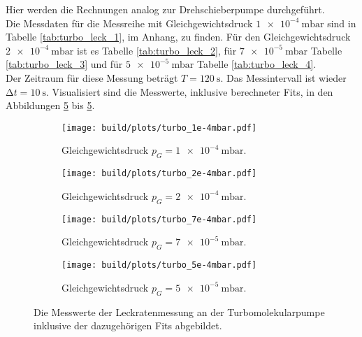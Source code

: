         \noindent
        Hier werden die Rechnungen analog zur Drehschieberpumpe durchgeführt.\\
        Die Messdaten für die Messreihe mit Gleichgewichtsdruck $\SI{1e-4}{\milli\bar}$ sind in Tabelle \ref{tab:turbo_leck_1}, im Anhang, zu finden.
        Für den Gleichgewichtsdruck $\SI{2e-4}{\milli\bar}$ ist es Tabelle \ref{tab:turbo_leck_2}, für  $\SI{7e-5}{\milli\bar}$ Tabelle \ref{tab:turbo_leck_3}
        und für $\SI{5e-5}{\milli\bar}$ Tabelle \ref{tab:turbo_leck_4}.\\
        Der Zeitraum für diese Messung beträgt $ T = \SI{120}{\second}$. Das Messintervall ist wieder $ \increment t = \SI{10}{\second}$.
        Visualisiert sind die Messwerte, inklusive berechneter Fits, in den Abbildungen \ref{img:3} bis \ref{img:3}.
        \begin{figure}[H]
          \begin{subfigure}{0.46\textwidth}
                  \centering
                  \texttt{[image: build/plots/turbo\_1e-4mbar.pdf]}
                  \caption{Gleichgewichtsdruck $p_G = \SI{1e-4}{\milli\bar}$.}
                  \label{img:turbo_leck_1}
          \end{subfigure}
          \hfill
          \begin{subfigure}{0.46\textwidth}
                  \centering
                  \texttt{[image: build/plots/turbo\_2e-4mbar.pdf]}
                  \caption{Gleichgewichtsdruck $p_G = \SI{2e-4}{\milli\bar}$.}
                  \label{img:turbo_leck_2}
          \end{subfigure}
          \hfill
          \begin{subfigure}{0.46\textwidth}
            \centering
            \texttt{[image: build/plots/turbo\_7e-4mbar.pdf]}
            \caption{Gleichgewichtsdruck $p_G = \SI{7e-5}{\milli\bar}$.}
            \label{img:turbo_leck_3}
          \end{subfigure}
          \hfill
          \begin{subfigure}{0.46\textwidth}
            \centering
            \texttt{[image: build/plots/turbo\_5e-4mbar.pdf]}
            \caption{Gleichgewichtsdruck $p_G = \SI{5e-5}{\milli\bar}$.}
            \label{img:turbo_leck_4}
          \end{subfigure}
          \caption{Die Messwerte der Leckratenmessung an der Turbomolekularpumpe inklusive der dazugehörigen Fits abgebildet. }
          \label{img:3}
      \end{figure}

